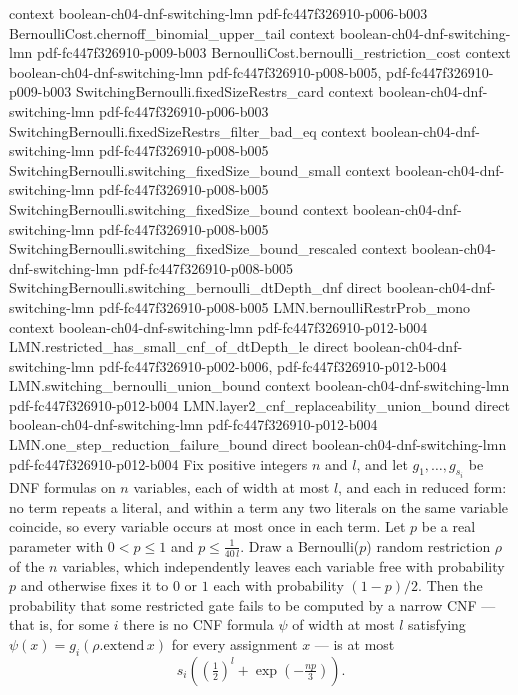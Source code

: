 \begin{theorem}
  {context}
  {boolean-ch04-dnf-switching-lmn}
  {pdf-fc447f326910-p006-b003}
\proofstep
  {BernoulliCost.chernoff_binomial_upper_tail}
  {context}
  {boolean-ch04-dnf-switching-lmn}
  {pdf-fc447f326910-p009-b003}
\proofstep
  {BernoulliCost.bernoulli_restriction_cost}
  {context}
  {boolean-ch04-dnf-switching-lmn}
  {pdf-fc447f326910-p008-b005,
    pdf-fc447f326910-p009-b003}
\proofstep
  {SwitchingBernoulli.fixedSizeRestrs_card}
  {context}
  {boolean-ch04-dnf-switching-lmn}
  {pdf-fc447f326910-p006-b003}
\proofstep
  {SwitchingBernoulli.fixedSizeRestrs_filter_bad_eq}
  {context}
  {boolean-ch04-dnf-switching-lmn}
  {pdf-fc447f326910-p008-b005}
\proofstep
  {SwitchingBernoulli.switching_fixedSize_bound_small}
  {context}
  {boolean-ch04-dnf-switching-lmn}
  {pdf-fc447f326910-p008-b005}
\proofstep
  {SwitchingBernoulli.switching_fixedSize_bound}
  {context}
  {boolean-ch04-dnf-switching-lmn}
  {pdf-fc447f326910-p008-b005}
\proofstep
  {SwitchingBernoulli.switching_fixedSize_bound_rescaled}
  {context}
  {boolean-ch04-dnf-switching-lmn}
  {pdf-fc447f326910-p008-b005}
\proofstep
  {SwitchingBernoulli.switching_bernoulli_dtDepth_dnf}
  {direct}
  {boolean-ch04-dnf-switching-lmn}
  {pdf-fc447f326910-p008-b005}
\proofstep
  {LMN.bernoulliRestrProb_mono}
  {context}
  {boolean-ch04-dnf-switching-lmn}
  {pdf-fc447f326910-p012-b004}
\proofstep
  {LMN.restricted_has_small_cnf_of_dtDepth_le}
  {direct}
  {boolean-ch04-dnf-switching-lmn}
  {pdf-fc447f326910-p002-b006,
    pdf-fc447f326910-p012-b004}
\proofstep
  {LMN.switching_bernoulli_union_bound}
  {context}
  {boolean-ch04-dnf-switching-lmn}
  {pdf-fc447f326910-p012-b004}
\proofstep
  {LMN.layer2_cnf_replaceability_union_bound}
  {direct}
  {boolean-ch04-dnf-switching-lmn}
  {pdf-fc447f326910-p012-b004}
\proofstep
  {LMN.one_step_reduction_failure_bound}
  {direct}
  {boolean-ch04-dnf-switching-lmn}
  {pdf-fc447f326910-p012-b004}
Fix positive integers $n$ and $l$, and let $g_1,\dots,g_{s_i}$ be DNF formulas on $n$
variables, each of width at most $l$, and each in reduced form: no term repeats a
literal, and within a term any two literals on the same variable coincide, so every
variable occurs at most once in each term. Let $p$ be a real parameter with $0 < p \le
1$ and $p \le \tfrac{1}{40\,l}$. Draw a Bernoulli($p$) random restriction $\rho$ of the
$n$ variables, which independently leaves each variable free with probability $p$ and
otherwise fixes it to $0$ or $1$ each with probability $(1-p)/2$. Then the probability
that some restricted gate fails to be computed by a narrow CNF — that is, for some $i$
there is no CNF formula $\psi$ of width at most $l$ satisfying $\psi(x) =
g_i(\rho.\mathrm{extend}\,x)$ for every assignment $x$ — is at most
\[
  s_i\left(\left(\tfrac{1}{2}\right)^{l} + \exp\!\left(-\tfrac{n p}{3}\right)\right).
\]
\end{theorem}

